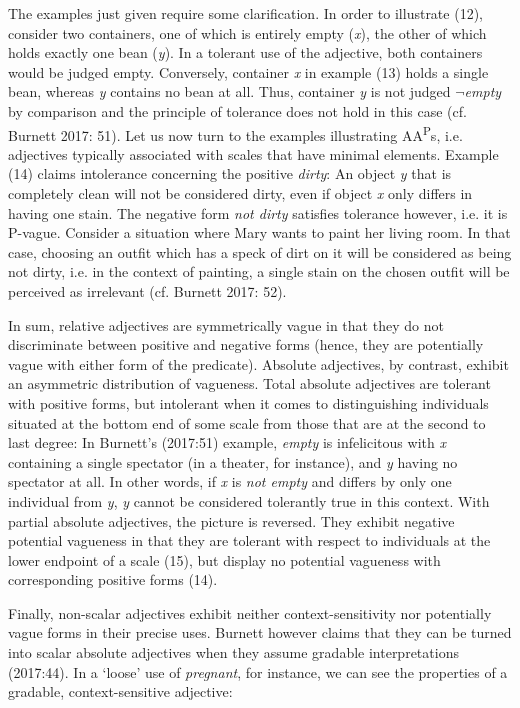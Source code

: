 \documentclass[output=paper
,modfonts
,nonflat]{langsci/langscibook}
\begin{document}
The examples just given require some clarification. In order to illustrate (12), consider two containers, one of which is entirely empty (\textit{x}), the other of which holds exactly one bean (\textit{y}). In a tolerant use of the adjective, both containers would be judged empty. Conversely, container \textit{x} in example (13) holds a single bean, whereas \textit{y} contains no bean at all. Thus, container \textit{y} is not judged $\neg$\textit{empty} by comparison and the principle of tolerance does not hold in this case (cf. Burnett 2017: 51). Let us now turn to the examples illustrating AA\textsuperscript{P}s, i.e. adjectives typically associated with scales that have minimal elements. Example (14) claims intolerance concerning the positive \textit{dirty}: An object \textit{y} that is completely clean will not be considered dirty, even if object \textit{x} only differs in having one stain. The negative form \textit{not dirty} satisfies tolerance however, i.e. it is P-vague. Consider a situation where Mary wants to paint her living room. In that case, choosing an outfit which has a speck of dirt on it will be considered as being not dirty, i.e. in the context of painting, a single stain on the chosen outfit will be perceived as irrelevant (cf. Burnett 2017: 52).

In sum, relative adjectives are symmetrically vague in that they do not discriminate between positive and negative forms (hence, they are potentially vague with either form of the predicate). Absolute adjectives, by contrast, exhibit an asymmetric distribution of vagueness. Total absolute adjectives are tolerant with positive forms, but intolerant when it comes to distinguishing individuals situated at the bottom end of some scale from those that are at the second to last degree: In Burnett's (2017:51) example, \textit{empty} is infelicitous with \textit{x} containing a single spectator (in a theater, for instance), and \textit{y} having no spectator at all. In other words, if \textit{x} is \textit{not empty} and differs by only one individual from \textit{y}, \textit{y} cannot be considered tolerantly true in this context.
With partial absolute adjectives, the picture is reversed. They exhibit negative potential vagueness in that they are tolerant with respect to individuals at the lower endpoint of a scale (15), but display no potential vagueness with corresponding positive forms (14).

Finally, non-scalar adjectives exhibit neither context-sensitivity nor potentially vague forms in their precise uses. Burnett however claims that they can be turned into scalar absolute adjectives when they assume gradable interpretations (2017:44). In a `loose' use of \textit{pregnant}, for instance, we can see the properties of a gradable, context-sensitive adjective: 
\end{document}
